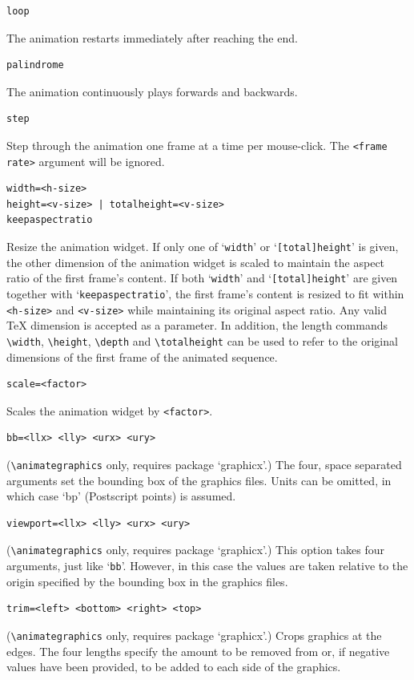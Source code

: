 \documentclass[a4paper]{article}
\begin{document}
\begin{verbatim}
loop
\end{verbatim}
The animation restarts immediately after reaching the end.
\begin{verbatim}
palindrome
\end{verbatim}
The animation continuously plays forwards and backwards.
\begin{verbatim}
step
\end{verbatim}
Step through the animation one frame at a time per mouse-click. The \verb+<frame rate>+ argument will be ignored.
\begin{verbatim}
width=<h-size>
height=<v-size> | totalheight=<v-size>
keepaspectratio
\end{verbatim}
Resize the animation widget. If only one of `\verb+width+' or `\verb+[total]height+' is given, the other dimension of the animation widget is scaled to maintain the aspect ratio of the first frame's content. If both `\verb+width+' and `\verb+[total]height+' are given together with `\verb+keepaspectratio+', the first frame's content is resized to fit within \verb+<h-size>+ and \verb+<v-size>+ while maintaining its original aspect ratio. Any valid \TeX{} dimension is accepted as a parameter. In addition, the length commands \verb+\width+, \verb+\height+, \verb+\depth+ and \verb+\totalheight+ can be used to refer to the original dimensions of the first frame of the animated sequence.
\begin{verbatim}
scale=<factor>
\end{verbatim}
Scales the animation widget by \verb+<factor>+.
\begin{verbatim}
bb=<llx> <lly> <urx> <ury>
\end{verbatim}
(\verb+\animategraphics+ only, requires package `graphicx'.) The four, space separated arguments set the bounding box of the graphics files. Units can be omitted, in which case `bp' (Postscript points) is assumed.
\begin{verbatim}
viewport=<llx> <lly> <urx> <ury>
\end{verbatim}
(\verb+\animategraphics+ only, requires package `graphicx'.) This option takes four arguments, just like `\verb+bb+'. However, in this case the values are taken relative to the origin specified by the bounding box in the graphics files.
\begin{verbatim}
trim=<left> <bottom> <right> <top>
\end{verbatim}
(\verb+\animategraphics+ only, requires package `graphicx'.) Crops graphics at the edges. The four lengths specify the amount to be removed from or, if negative values have been provided, to be added to each side of the graphics.
\end{document}
